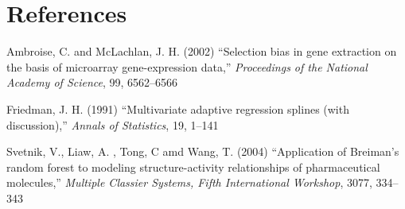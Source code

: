 \documentclass[12pt]{article}
\begin{document}
\section{References}

\begin{description}    
  \item Ambroise, C. and McLachlan, J. H. (2002) ``Selection bias in gene extraction on the basis of microarray gene-expression data,'' {\it Proceedings of the National Academy of Science}, 99, 6562--6566
  
  \item Friedman, J. H. (1991) ``Multivariate adaptive regression splines (with discussion),'' {\it Annals of Statistics}, 19, 1--141
  \item  Svetnik, V., Liaw, A. , Tong, C amd Wang, T. (2004) ``Application of Breiman's random forest to modeling structure-activity relationships of pharmaceutical molecules,'' {\it Multiple Classier Systems, Fifth International Workshop}, 3077, 334--343
  \end{description}
\end{document}
